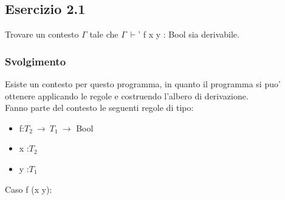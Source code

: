     \vspace*{1 cm}

\subsection*{Esercizio 2.1}
Trovare un contesto $\Gamma$ tale che $\Gamma\:\vdash$' f x y : Bool sia derivabile.

\subsubsection*{Svolgimento}
 	\begin{prooftree} 
	\end{prooftree} 
	
	Esiste un contesto per questo programma, in quanto il programma si puo' ottenere applicando le regole e costruendo l'albero di derivazione. \\
	Fanno parte del contesto le seguenti regole di tipo:
\begin{itemize}
	\item f:$T_2\:\rightarrow\:T_1\:\rightarrow$ Bool
	\item x :$T_2$
	\item y :$T_1$
\end{itemize}

\vspace*{2 cm}
Caso f (x y):\\
 	\begin{prooftree} 
	\end{prooftree} 
	
